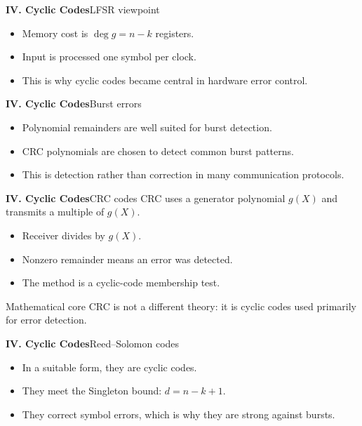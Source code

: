 \begin{frame}{\textbf{IV. Cyclic Codes}}{LFSR viewpoint}
\small
{}
\begin{itemize}
  \item Memory cost is $\deg g=n-k$ registers.
  \item Input is processed one symbol per clock.
  \item This is why cyclic codes became central in hardware error control.
\end{itemize}
\end{frame}

\begin{frame}{\textbf{IV. Cyclic Codes}}{Burst errors}
\small
{}
\begin{itemize}
  \item Polynomial remainders are well suited for burst detection.
  \item CRC polynomials are chosen to detect common burst patterns.
  \item This is detection rather than correction in many communication protocols.
\end{itemize}
\end{frame}

\begin{frame}{\textbf{IV. Cyclic Codes}}{CRC codes}
\small
CRC uses a generator polynomial $g(X)$ and transmits a multiple of $g(X)$.
\begin{itemize}
  \item Receiver divides by $g(X)$.
  \item Nonzero remainder means an error was detected.
  \item The method is a cyclic-code membership test.
\end{itemize}
\begin{block}{Mathematical core}
CRC is not a different theory: it is cyclic codes used primarily for error detection.
\end{block}
\end{frame}

\begin{frame}{\textbf{IV. Cyclic Codes}}{Reed--Solomon codes}
\small
{}
\begin{itemize}
  \item In a suitable form, they are cyclic codes.
  \item They meet the Singleton bound: $d=n-k+1$.
  \item They correct symbol errors, which is why they are strong against bursts.
\end{itemize}
\end{frame}

